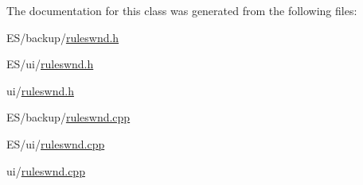 The documentation for this class was generated from the following files:\begin{DoxyCompactItemize}
\item 
ES/backup/\hyperlink{_e_s_2backup_2ruleswnd_8h}{ruleswnd.h}\item 
ES/ui/\hyperlink{_e_s_2ui_2ruleswnd_8h}{ruleswnd.h}\item 
ui/\hyperlink{ui_2ruleswnd_8h}{ruleswnd.h}\item 
ES/backup/\hyperlink{_e_s_2backup_2ruleswnd_8cpp}{ruleswnd.cpp}\item 
ES/ui/\hyperlink{_e_s_2ui_2ruleswnd_8cpp}{ruleswnd.cpp}\item 
ui/\hyperlink{ui_2ruleswnd_8cpp}{ruleswnd.cpp}\end{DoxyCompactItemize}
